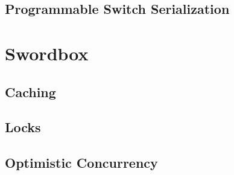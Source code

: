 \subsection{Programmable Switch Serialization}

\section{Swordbox}

\subsection{Caching}

\subsection{Locks}

\subsection{Optimistic Concurrency}
